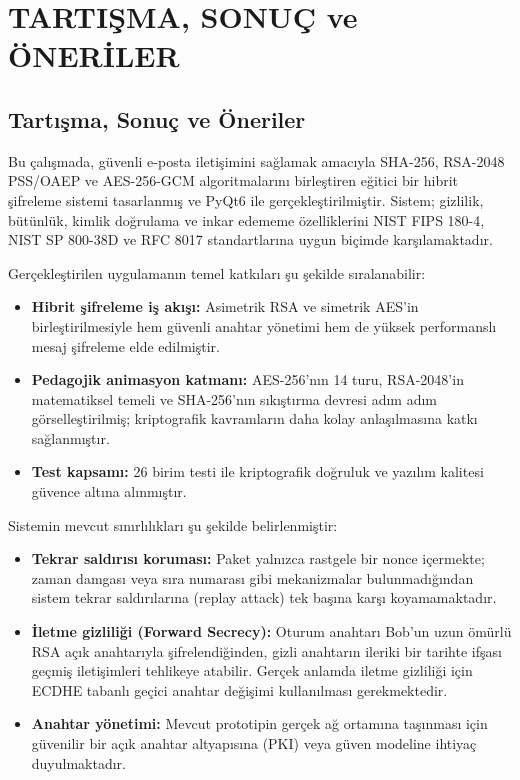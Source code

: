 \chapter{TARTIŞMA, SONUÇ ve ÖNERİLER}
\label{Ch:Sonuclar}
\section{Tartışma, Sonuç ve Öneriler}

Bu çalışmada, güvenli e-posta iletişimini sağlamak amacıyla SHA-256, RSA-2048 PSS/OAEP ve AES-256-GCM algoritmalarını birleştiren eğitici bir hibrit şifreleme sistemi tasarlanmış ve PyQt6 ile gerçekleştirilmiştir. Sistem; gizlilik, bütünlük, kimlik doğrulama ve inkar edememe özelliklerini NIST FIPS 180-4, NIST SP 800-38D ve RFC 8017 standartlarına uygun biçimde karşılamaktadır.

Gerçekleştirilen uygulamanın temel katkıları şu şekilde sıralanabilir:

\begin{itemize}
    \item \textbf{Hibrit şifreleme iş akışı:} Asimetrik RSA ve simetrik AES'in birleştirilmesiyle hem güvenli anahtar yönetimi hem de yüksek performanslı mesaj şifreleme elde edilmiştir.
    \item \textbf{Pedagojik animasyon katmanı:} AES-256'nın 14 turu, RSA-2048'in matematiksel temeli ve SHA-256'nın sıkıştırma devresi adım adım görselleştirilmiş; kriptografik kavramların daha kolay anlaşılmasına katkı sağlanmıştır.
    \item \textbf{Test kapsamı:} 26 birim testi ile kriptografik doğruluk ve yazılım kalitesi güvence altına alınmıştır.
\end{itemize}

Sistemin mevcut sınırlılıkları şu şekilde belirlenmiştir:

\begin{itemize}
    \item \textbf{Tekrar saldırısı koruması:} Paket yalnızca rastgele bir nonce içermekte; zaman damgası veya sıra numarası gibi mekanizmalar bulunmadığından sistem tekrar saldırılarına (replay attack) tek başına karşı koyamamaktadır.
    \item \textbf{İletme gizliliği (Forward Secrecy):} Oturum anahtarı Bob'un uzun ömürlü RSA açık anahtarıyla şifrelendiğinden, gizli anahtarın ileriki bir tarihte ifşası geçmiş iletişimleri tehlikeye atabilir. Gerçek anlamda iletme gizliliği için ECDHE tabanlı geçici anahtar değişimi kullanılması gerekmektedir.
    \item \textbf{Anahtar yönetimi:} Mevcut prototipin gerçek ağ ortamına taşınması için güvenilir bir açık anahtar altyapısına (PKI) veya güven modeline ihtiyaç duyulmaktadır.
\end{itemize}

